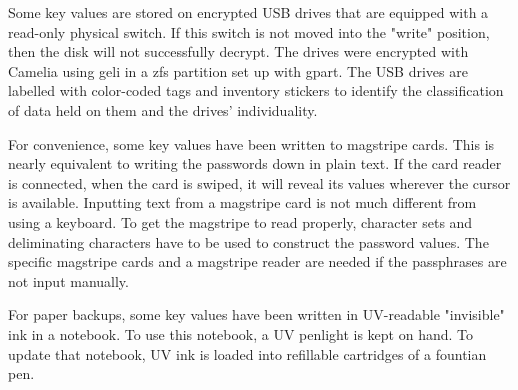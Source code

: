 Some key values are stored on encrypted USB drives that are equipped with a read-only physical switch.  If this switch is not moved into the "write" position, then the disk will not successfully decrypt.  The drives were encrypted with Camelia using geli in a  \gls{zfs} \gls{partition} set up with gpart.  The USB drives are labelled with color-coded tags and inventory stickers to identify the classification of data held on them and the drives' individuality.

For convenience, some key values have been written to magstripe cards.  This is nearly equivalent to writing the passwords down in plain text.  If the card reader is connected, when the card is swiped, it will reveal its values wherever the cursor is available.  Inputting text from a magstripe card is not much different from using a keyboard.  To get the magstripe to read properly, character sets and deliminating characters have to be used to construct the \gls{password} values.  The specific magstripe cards and a magstripe reader are needed if the passphrases are not input manually.

For paper backups, some key values have been written in UV-readable "invisible" ink in a notebook.  To use this notebook, a UV penlight is kept on hand.  To update that notebook, UV ink is loaded into refillable cartridges of a fountian pen.

